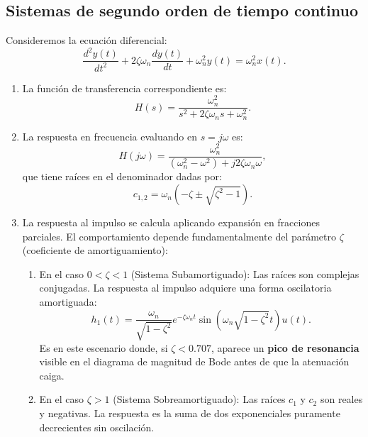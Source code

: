 \documentclass[11pt,a4paper,openany]{book}
\begin{document}
\subsection{Sistemas de segundo orden de tiempo continuo}

Consideremos la ecuaci\'{o}n diferencial:
\begin{equation}
	\frac{d^{2}y(t)}{dt^{2}} + 2\zeta \omega_{n} \frac{dy(t)}{dt} + \omega_{n}^{2} y(t) = \omega_{n}^{2} x(t).
\end{equation}

\begin{enumerate}
	\item La funci\'{o}n de transferencia correspondiente es:
	\begin{equation}
		H(s) = \frac{\omega_{n}^{2}}{s^{2} + 2\zeta \omega_{n} s + \omega_{n}^{2}}.
	\end{equation}
	
	\item La respuesta en frecuencia evaluando en $s = j\omega$ es:
	\begin{equation}
		H(j\omega) = \frac{\omega_{n}^{2}}{(\omega_{n}^{2} - \omega^{2}) + j 2\zeta \omega_{n} \omega},
	\end{equation}
	que tiene ra\'{i}ces en el denominador dadas por:
	\begin{equation}
		c_{1,2} = \omega_{n} \left( -\zeta \pm \sqrt{\zeta^{2}-1} \right).
	\end{equation}
	
	\item La respuesta al impulso se calcula aplicando expansi\'{o}n en fracciones parciales. El comportamiento depende fundamentalmente del par\'{a}metro $\zeta$ (coeficiente de amortiguamiento):
	
	\begin{enumerate}
		\item En el caso $0 < \zeta < 1$ (Sistema Subamortiguado): Las ra\'{i}ces son complejas conjugadas. La respuesta al impulso adquiere una forma oscilatoria amortiguada:
		\begin{equation}
			h_{1}(t) = \frac{\omega_{n}}{\sqrt{1-\zeta^{2}}} e^{-\zeta \omega_{n} t} \sin\left(\omega_{n}\sqrt{1-\zeta^{2}}t\right) u(t).
		\end{equation}
		Es en este escenario donde, si $\zeta < 0.707$, aparece un \textbf{pico de resonancia} visible en el diagrama de magnitud de Bode antes de que la atenuaci\'{o}n caiga.
		
		\item En el caso $\zeta > 1$ (Sistema Sobreamortiguado): Las ra\'{i}ces $c_{1}$ y $c_{2}$ son reales y negativas. La respuesta es la suma de dos exponenciales puramente decrecientes sin oscilaci\'{o}n.
		

\end{enumerate}
\end{enumerate}
\end{document}
